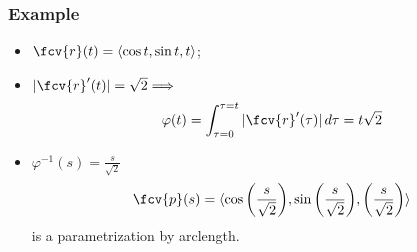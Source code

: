 \begin{frame}
\frametitle{Example}
\begin{itemize}
\item $\fcv{r}(t) = \langle \cos{t}, \sin{t}, t\rangle$;
\item $|\fcv{r}'(t)| = \sqrt{2} \Longrightarrow $
$$\varphi(t) = \int_{\tau=0}^{\tau=t}|\fcv{r}'(\tau)|\, d\tau =  t\sqrt{2}$$
\item $\varphi^{-1}(s) = \frac{s}{\sqrt{2}}$
\[
\fcv{p}(s) = \langle \cos{\left( \frac{s}{\sqrt{2}} \right)}, \sin{\left( \frac{s}{\sqrt{2}} \right)}, \left( \frac{s}{\sqrt{2}} \right) \rangle
\]
is a parametrization by arclength.
\end{itemize}
\end{frame}